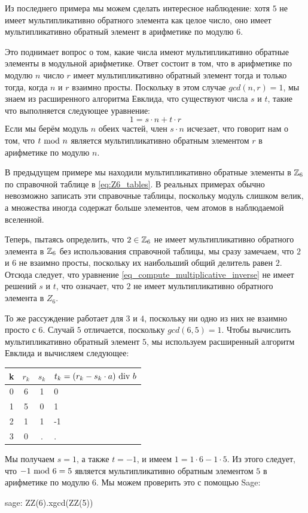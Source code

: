 Из последнего примера мы можем сделать интересное наблюдение: хотя $5$ не имеет мультипликативно обратного элемента как целое число, оно имеет мультипликативно обратный элемент в арифметике по модулю $6$.

Это поднимает вопрос о том, какие числа имеют мультипликативно обратные элементы в модульной арифметике. Ответ состоит в том, что в арифметике по модулю $n$ число $r$ имеет мультипликативно обратный элемент тогда и только тогда, когда $n$ и $r$ взаимно просты. Поскольку в этом случае $gcd(n,r)=1$, мы знаем из расширенного алгоритма Евклида, что существуют числа $s$ и $t$, такие что выполняется следующее уравнение:
\begin{equation}
\label{eq_compute_multiplicative_inverse}
1 = s\cdot n + t\cdot r
\end{equation}
Если мы берём модуль $n$ обеих частей, член $s\cdot n$ исчезает, что говорит нам о том, что $t \text{ mod } n$ является мультипликативно обратным элементом $r$ в арифметике по модулю $n$.
\begin{example} В предыдущем примере мы находили мультипликативно обратные элементы в $\mathbb{Z}_6$ по справочной таблице в \eqref{eq:Z6_tables}. В реальных примерах обычно невозможно записать эти справочные таблицы, поскольку модуль слишком велик, а множества иногда содержат больше элементов, чем атомов в наблюдаемой вселенной.

Теперь, пытаясь определить, что $2\in \mathbb{Z}_6$ не имеет мультипликативно обратного элемента в $\mathbb{Z}_6$ без использования справочной таблицы, мы сразу замечаем, что $2$ и $6$ не взаимно просты, поскольку их наибольший общий делитель равен $2$. Отсюда следует, что уравнение \ref{eq_compute_multiplicative_inverse} не имеет решений $s$ и $t$, что означает, что $2$ не имеет мультипликативно обратного элемента в $Z_6$.

То же рассуждение работает для $3$ и $4$, поскольку ни одно из них не взаимно просто с $6$. Случай $5$ отличается, поскольку $gcd(6,5)=1$. Чтобы вычислить мультипликативно обратный элемент $5$, мы используем расширенный алгоритм Евклида и вычисляем следующее:
\begin{center}
  \begin{tabular}{c | c c l}
    k & $ r_k $ & $ s_k $ & $ t_k = (r_k-s_k \cdot a) \text{ div } b $ \\\hline
    0 & 6 & 1 & 0 \\
    1 & 5 & 0 & 1 \\
    2 & 1 & 1 & -1 \\
    3 & 0 & . & . \\
  \end{tabular}
\end{center}

Мы получаем $s=1$, а также $t=-1$, и имеем $1 = 1\cdot 6 -1\cdot 5$. Из этого следует, что $-1 \text{ mod } 6=5$ является мультипликативно обратным элементом $5$ в арифметике по модулю $6$. Мы можем проверить это с помощью Sage:
\begin{sagecommandline}
sage: ZZ(6).xgcd(ZZ(5))
\end{sagecommandline}
\end{example}
